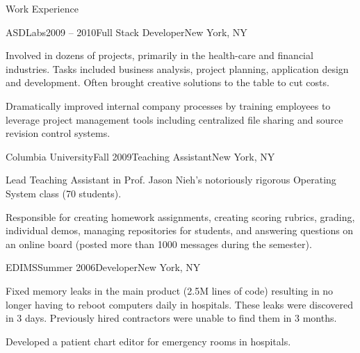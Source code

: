 \documentclass{resume} %
\begin{document}
\begin{rSection}{Work Experience}
\begin{rSubsection}{ASDLabs}{2009 -- 2010}{Full Stack Developer}{New York, NY}
\item Involved in dozens of projects, primarily in the health-care and financial
      industries. Tasks included business analysis, project planning, application
      design and development. Often brought creative solutions to the table to cut costs.
\item Dramatically improved internal company processes by training employees to
      leverage project management tools including centralized file sharing and source revision control systems.
\end{rSubsection}

\begin{rSubsection}{Columbia University}{Fall 2009}{Teaching Assistant}{New York, NY}
\item Lead Teaching Assistant in Prof. Jason Nieh's notoriously rigorous Operating System class (70 students).
\item Responsible for creating homework assignments, creating scoring rubrics, grading,
individual demos, managing repositories for students, and answering questions on an online board (posted more
than 1000 messages during the semester).
\end{rSubsection}

\begin{rSubsection}{EDIMS}{Summer 2006}{Developer}{New York, NY}
\item Fixed memory leaks in the main product (2.5M lines of code)
      resulting in no longer having to reboot computers daily in hospitals.
      These leaks were discovered in 3 days. Previously hired contractors were unable to find them in 3 months.


\item Developed a patient chart editor for emergency rooms in hospitals.
\end{rSubsection}


\end{rSection}
\end{document}
